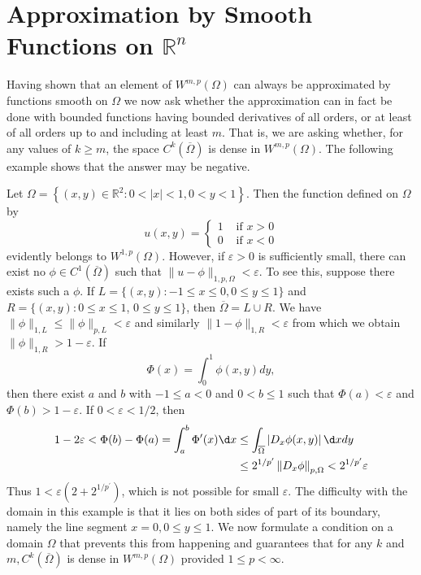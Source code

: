 \section{Approximation by Smooth Functions on $\mathbb{R}^n$}


\begin{para}
  Having shown that an element of $W^{m,p}(\Omega)$ can always be approximated by functions 
  smooth on $\Omega$ we now ask whether the approximation can in fact be done with bounded 
  functions having bounded derivatives of all orders, or at least of all orders up to and 
  including at least $m$. That is, we are asking whether, for any values of $k \geq m$, the space 
  $C^k(\overline{\Omega})$ is dense in $W^{m,p}(\Omega)$. The following example shows that the answer 
  may be negative.
\end{para}


\begin{example}
  Let $\Omega=\left\{(x, y) \in \mathbb{R}^2: 0<|x|<1,0<y<1\right\}$. Then the function defined on $\Omega$ by
  \[
  u(x, y)= \begin{cases}1 & \text { if } x>0 \\ 0 & \text { if } x<0\end{cases}
  \]
  evidently belongs to $W^{1, p}(\Omega)$. However, if $\varepsilon>0$ is sufficiently small, 
  there can exist no $\phi \in C^1(\overline{\Omega})$ such that
  $\|u-\phi\|_{1, p, \Omega}<\varepsilon$. To see this, suppose there exists such a $\phi$.
  If $L=\{(x, y):-1 \leq x \leq 0,0 \leq y \leq 1\}$ and $R=\{(x, y): 0 \leq x \leq 1$, $0 \leq y \leq 1\}$, then $\overline{\Omega}=L \cup R$.
  We have $\|\phi\|_{1, L} \leq\|\phi\|_{p, L}<\varepsilon$ and
  similarly $\|1-\phi\|_{1, R}<\varepsilon$ from which we obtain $\|\phi\|_{1, R}>1-\varepsilon$. 
  If
  \[
  \Phi(x)=\int_0^1 \phi(x, y) d y,
  \]
  then there exist $a$ and $b$ with $-1 \leq a<0$ and $0<b \leq 1$ such
  that $\Phi(a)<\varepsilon$ and $\Phi(b)>1-\varepsilon$. If $0<\varepsilon<1 / 2$, then
  \[
  \begin{aligned}
  1-2 \varepsilon<\Phi(b)-\Phi(a)=\int_a^b \Phi^{\prime}(x) \d x & \leq \int_{\overline{\Omega}}\left|D_x \phi(x, y)\right| \d x d y \\
  & \leq 2^{1 / p^{\prime}}\left\|D_x \phi\right\|_{p, \Omega}<2^{1 / p^{\prime}} \varepsilon
  \end{aligned}
  \]
  Thus $1<\varepsilon\left(2+2^{1 / p^{\prime}}\right)$, which is not possible for small $\varepsilon$.
  The difficulty with the domain in this example is that it lies on both sides of part of its 
  boundary, namely the line segment $x=0,0 \leq y \leq 1$. We now formulate a condition on a 
  domain $\Omega$ that prevents this from happening and guarantees that for any $k$
  and $m, C^k(\overline{\Omega})$ is dense in $W^{m,p}(\Omega)$ provided $1 \leq p<\infty$.
\end{example}


